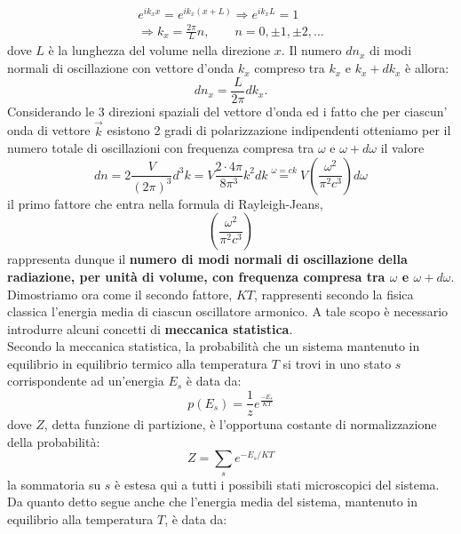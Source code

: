 \documentclass[a4paper,12pt,oneside]{book}
\begin{document}
\begin{eqnarray}
e^{ik_x x}= e^{ik_x (x+L)} \Rightarrow e^{ik_x L}=1  \nonumber\\ \Rightarrow k_x=\frac{2\pi}{L}n, \qquad n= 0, \pm 1, \pm 2,...
\end{eqnarray}
dove $L$ è la lunghezza del volume nella direzione $x$. Il numero $dn_x$ di modi normali di oscillazione con vettore d'onda $k_x$ compreso tra $k_x$ e $k_x+dk_x$ è allora:
\begin{equation}
dn_x =\frac{L}{2\pi}dk_x.
\end{equation}
Considerando le 3 direzioni spaziali del vettore d'onda ed i fatto che per ciascun' onda di vettore $\vec{k}$ esistono 2 gradi di polarizzazione indipendenti otteniamo per il numero totale di oscillazioni con frequenza compresa tra $\omega$ e $\omega + d\omega$ il valore
\begin{equation}
dn =2\frac{V}{(2\pi)^3}d^3k= V \frac{2\cdot 4\pi}{8\pi ^3} k^2 dk \overset{\omega =ck}{=} V \left( \frac{\omega ^2}{\pi ^2 c^3}\right) d\omega
\end{equation}
il primo fattore che entra nella formula di Rayleigh-Jeans,
\begin{equation}
\left( \frac{\omega ^2}{\pi ^2 c^3} \right)
\label{eq:cap1_1}
\end{equation}
rappresenta dunque il \textbf{numero di modi normali di oscillazione della radiazione, per unità di volume, con frequenza compresa tra $\omega$ e $\omega + d\omega$}.\\
Dimostriamo ora come il secondo fattore, $KT$, rappresenti secondo la fisica classica l'energia media di ciascun oscillatore armonico. A tale scopo è necessario introdurre alcuni concetti di \textbf{meccanica statistica}.\\
Secondo la meccanica statistica, la probabilità che un sistema mantenuto in equilibrio in equilibrio termico alla temperatura $T$ si trovi in uno stato $s$ corrispondente ad un'energia $E_s$ è data da:
\begin{equation}
p(E_s) =\frac{1}{z}e^{\frac{-E_s}{KT}}
\end{equation}
dove $Z$, detta funzione di partizione, è l'opportuna costante di normalizzazione della probabilità:
\begin{equation}
Z= \sum _s e^{-E_s / KT}
\end{equation} 
la sommatoria su $s$ è estesa qui a tutti i possibili stati microscopici del sistema.
Da quanto detto segue anche che l'energia media del sistema, mantenuto in equilibrio alla temperatura $T$, è data da:
\end{document}
